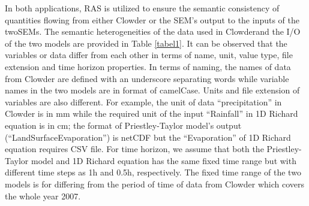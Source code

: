 \documentclass[review]{elsarticle}
\begin{document}
In both applications, RAS is utilized to ensure the semantic consistency of quantities flowing from either Clowder or the SEM’s output to the inputs of the twoSEMs. The semantic heterogeneities of the data used in Clowderand the I/O of the two models are provided in Table \ref{tabel1}. It can be observed that the variables or data differ from each other in terms of name, unit, value type, file extension and time horizon properties. In terms of naming, the names of data from Clowder are defined with an underscore separating words while variable names in the two models are in format of camelCase. Units and file extension of variables are also different. For example, the unit of data “precipitation” in Clowder is in mm while the required unit of the input “Rainfall” in 1D Richard equation is in cm; the format of Priestley-Taylor model’s output (“LandSurfaceEvaporation”) is netCDF but the “Evaporation” of 1D Richard equation requires CSV file. For time horizon, we assume that both the Priestley-Taylor model and 1D Richard equation has the same fixed time range but with different time steps as 1h and 0.5h, respectively. The fixed time range of the two models is for differing from the period of time of data from Clowder which covers the whole year 2007. 
\end{document}
